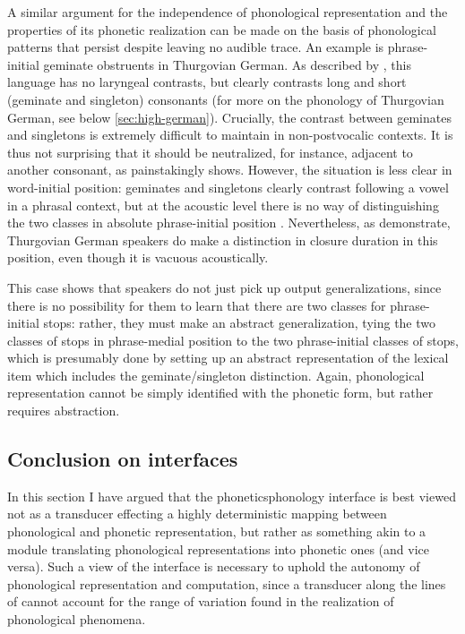 A similar argument for the independence of phonological representation and the properties of its phonetic realization can be made on the basis of phonological patterns that persist despite leaving no audible trace. An example is phrase\hyp initial geminate obstruents in Thurgovian German. As described by \citet{kraehenmann01:_swiss_german,kraehenmann03:_quant_aleman}, this language has no laryngeal contrasts, but clearly contrasts long and short (geminate and singleton) consonants (for more on the phonology of Thurgovian German, see below \cref{sec:high-german}). Crucially, the contrast between geminates and singletons is extremely difficult to maintain in non\hyp post\-vocalic contexts. It is thus not surprising that it should be neutralized, for instance, adjacent to another consonant, as \citeauthor{kraehenmann03:_quant_aleman} painstakingly shows. However, the situation is less clear in word\hyp initial position: geminates and singletons clearly contrast following a vowel in a phrasal context, but at the acoustic level there is no way of distinguishing the two classes in absolute phrase\hyp initial position \citep{kraehenmann03:_quant_aleman}. Nevertheless, as \citet{kraehenmann08:_durat_swiss_german} demonstrate, Thurgovian German speakers do make a distinction in closure duration in this position, even though it is vacuous acoustically.

This case shows that speakers do not just pick up output generalizations, since there is no possibility for them to learn that there are two classes for phrase\hyp initial stops: rather, they must make an abstract generalization, tying the two classes of stops in phrase\hyp medial position to the two phrase\hyp initial classes of stops, which is presumably done by setting up an abstract representation of the lexical item which includes the geminate\fshyp singleton distinction. Again, phonological representation cannot be simply identified with the phonetic form, but rather requires
abstraction.

\subsection{Conclusion on interfaces}
\label{sec:concl-interf}

In this section I have argued that the phonetics\endash phonology interface is best viewed not as a transducer effecting a highly deterministic mapping between phonological and phonetic representation, but rather as something akin to a module translating phonological representations into phonetic ones (and vice versa). Such a view of the interface is necessary to uphold the autonomy of phonological representation and computation, since a transducer along the lines of \citet{hale-kissock-reiss,hale-reiss2008} cannot account for the range of variation found in the realization of phonological phenomena.

